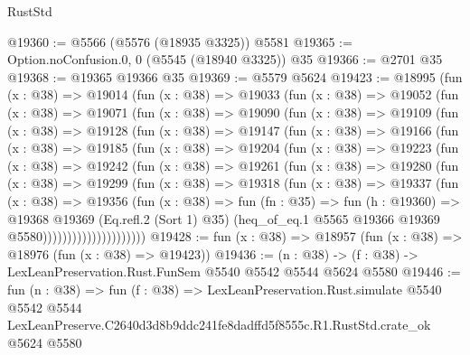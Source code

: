 \begin{lexlean}{RustStd}
\begin{coremodule}
@19360 := @5566 (@5576 (@18935 @3325)) @5581
@19365 := Option.noConfusion.{0, 0} (@5545 (@18940 @3325)) @35
@19366 := @2701 @35
@19368 := @19365 @19366 @35
@19369 := @5579 @5624
@19423 := @18995
    (fun (x : @38) =>
    @19014
      (fun (x : @38) =>
      @19033
        (fun (x : @38) =>
        @19052
          (fun (x : @38) =>
          @19071
            (fun (x : @38) =>
            @19090
              (fun (x : @38) =>
              @19109
                (fun (x : @38) =>
                @19128
                  (fun (x : @38) =>
                  @19147
                    (fun (x : @38) =>
                    @19166
                      (fun (x : @38) =>
                      @19185
                        (fun (x : @38) =>
                        @19204
                          (fun (x : @38) =>
                          @19223
                            (fun (x : @38) =>
                            @19242
                              (fun (x : @38) =>
                              @19261
                                (fun (x : @38) =>
                                @19280
                                  (fun (x : @38) =>
                                  @19299
                                    (fun (x : @38) =>
                                    @19318
                                      (fun (x : @38) =>
                                      @19337
                                        (fun (x : @38) =>
                                        @19356
                                          (fun (x : @38) =>
                                          fun (fn : @35) =>
                                          fun (h : @19360) =>
                                          @19368
                                            @19369
                                            (Eq.refl.{2} (Sort 1) @35)
                                            (heq_of_eq.{1}
                                              @5565
                                              @19366
                                              @19369
                                              @5580)))))))))))))))))))))
@19428 := fun (x : @38) => @18957 (fun (x : @38) => @18976 (fun (x : @38) => @19423))
@19436 := (n : @38) -> (f : @38) -> LexLeanPreservation.Rust.FunSem @5540 @5542 @5544 @5624 @5580
@19446 := fun (n : @38) =>
  fun (f : @38) =>
  LexLeanPreservation.Rust.simulate
    @5540
    @5542
    @5544
    LexLeanPreserve.C2640d3d8b9ddc241fe8dadffd5f8555c.R1.RustStd.crate_ok
    @5624
    @5580
\end{coremodule}
\end{lexlean}
